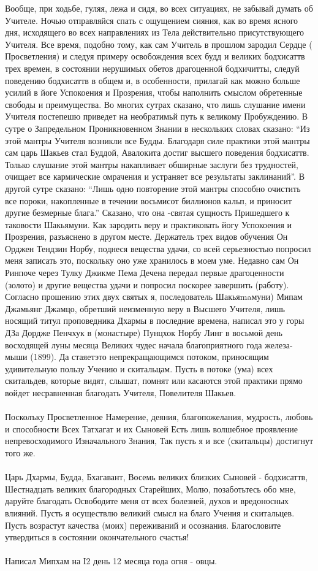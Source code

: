 Вообще, при ходьбе, гуляя, лежа и сидя, во всех ситуациях, не забывай думать об Учителе.
Ночью отправляйся спать с ощущением сияния, как во время ясного дня, исходящего
во всех направлениях из Тела действительно присутствующего Учителя. Все время,
подобно тому, как сам Учитель в прошлом зародил Сердце ( Просветления) и следуя
примеру освобождения всех будд и великих бодхисаттв трех времен, в состоянии
нерушимых обетов драгоценной бодхичитты, следуй поведению бодхисаттв в общем и,
в особенности, прилагай как можно больше усилий в йоге Успокоения и Прозрения,
чтобы наполнить смыслом обретенные свободы и преимущества.
Во многих сутрах сказано, что лишь слушание имени Учителя постепешю приведет
на необратимьй путь к великому Пробуждению. В сутре о Запредельном Проникновенном
Знании в нескольких словах сказано:
“Из этой мантры Учителя возникли все Будды. Благодаря силе практики этой мантры
сам царь Шакьев стал Буддой, Авалокита достиг высшего поведения бодхисаттв.
Только слушание этой мантры накапливает обширные заслуги без трудностей,
очищает все кармические омрачения и устраняет все результаты заклинаний”.
В другой сутре сказано: “Лишь одно повторение этой мантры способно очистить
все пороки, накопленные в течении восьмисот биллионов кальп, и приносит другие
безмерные блага.” Сказано, что она -святая сущность Пришедшего к таковости Шакьямуни.
Как зародить веру и практиковать йогу Успокоения и Прозрения, разъяснено в другом месте.
Держатель трех видов обучения Он Орджен Тендзин Норбу, поднеся вещества удачи,
со всей серьезностью попросил меня записать это, поскольку оно уже хранилось
в моем уме. Недавно сам Он Ринпоче через Тулку Джикме Пема Дечена передал
первые драгоценности (золото) и другие вещества удачи и попросил поскорее
завершить (работу). Согласно прошению этих двух святых я, последователь
Шакьяmaмуни) Мипам Джамьянг Джамцо, обретший неизменную веру в Высшего
Учителя, лишь носящий титул проповедника Дхармы в последние времена,
написал это у горы ДЗа Дордже Пенчхук в (монастыре) Пунцхок Норбу Линг
в восьмой день восходящей луны месяца Великих чудес начала благоприятного
года железа-мыши (1899). Да стаяетэто непрекращающимся потоком, приносящим
удивительную пользу Учению и скитальцам. Пусть в потоке (ума) всех скитальдев,
которые видят, слышат, помнят или касаются этой практики прямо войдет несравненная
благодать Учителя, Повелителя Шакьев.\\
\\
Посколъку Просветленное Намерение, деяния, благопожелания, мудрость, любовь и способности
Всех Татхагат и их Сыновей
Есть лишь волшебное проявление непревосходимого Изначального Знания,
Так пусть я и все (скитальцы) достигнут того же.\\
\\
Царь Дхармы, Будда, Бхагавант,
Восемь великих близких Сыновей - бодхисаттв,
Шестнадцать великих благородных Старейших,
Молю, позаботьтесь обо мне, даруйте благодать
Освободите меня от всех болезней, духов и вредоносных влияний.
Пусть я осуществлю великий смысл на благо Учения и скитальцев.
Пусть возрастут качества (моих) переживаний и осознания.
Благословите утвердиться в состоянии окончательного счастья!\\
\\
Написал Мипхам на І2 день 12 месяца года огня - овцы.
\footnotesize
